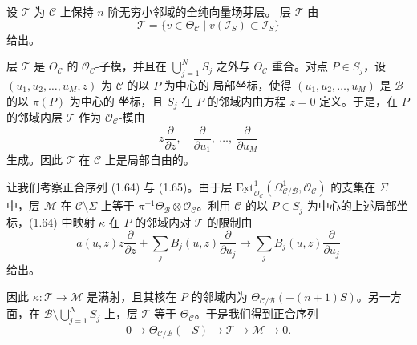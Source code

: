 设 $\mathcal{T}$ 为 $\mathcal{C}$ 上保持 $n$ 阶无穷小邻域的全纯向量场芽层。
层 $\mathcal{T}$ 由
\begin{equation}
\mathcal{T}=\{v\in\Theta_{\mathcal{C}}\mid
v(\mathcal{I}_S)\subset\mathcal{I}_S\} \tag{1.66}
\end{equation}
给出。

层 $\mathcal{T}$ 是 $\Theta_{\mathcal{C}}$ 的
$\mathcal{O}_{\mathcal{C}}$-子模，并且在
$\bigcup_{j=1}^{N}S_j$ 之外与 $\Theta_{\mathcal{C}}$ 重合。对点
$P\in S_j$，设 $(u_1,u_2,\dots,u_M,z)$ 为 $\mathcal{C}$ 的以 $P$ 为中心的
局部坐标，使得 $(u_1,u_2,\dots,u_M)$ 是 $\mathcal{B}$ 的以 $\pi(P)$ 为中心的
坐标，且 $S_j$ 在 $P$ 的邻域内由方程 $z=0$ 定义。于是，在 $P$ 的邻域内层
$\mathcal{T}$ 作为 $\mathcal{O}_{\mathcal{C}}$-模由
\[
z\frac{\partial}{\partial z},\quad
\frac{\partial}{\partial u_1},\ \dots,\
\frac{\partial}{\partial u_M}
\]
生成。因此 $\mathcal{T}$ 在 $\mathcal{C}$ 上是局部自由的。

让我们考察正合序列 (1.64) 与 (1.65)。由于层
$\underline{\mathrm{Ext}}^1_{\mathcal{O}_{\mathcal{C}}}
(\Omega^1_{\mathcal{C}/\mathcal{B}},\mathcal{O}_{\mathcal{C}})$ 的支集在
$\Sigma$ 中，层 $\mathcal{M}$ 在 $\mathcal{C}\setminus\Sigma$ 上等于
$\pi^{-1}\Theta_{\mathcal{B}}\otimes\mathcal{O}_{\mathcal{C}}$。利用
$\mathcal{C}$ 的以 $P\in S_j$ 为中心的上述局部坐标，(1.64) 中映射 $\kappa$
在 $P$ 的邻域内对 $\mathcal{T}$ 的限制由
\[
a(u,z)z\frac{\partial}{\partial z}
+\sum_j B_j(u,z)\frac{\partial}{\partial u_j}
\longmapsto\sum_j B_j(u,z)\frac{\partial}{\partial u_j}
\]
给出。


因此 $\kappa:\mathcal{T}\to\mathcal{M}$ 是满射，且其核在 $P$ 的邻域内为
$\Theta_{\mathcal{C}/\mathcal{B}}(-(n+1)S)$。另一方面，在
$\mathcal{B}\setminus\bigcup_{j=1}^{N}S_j$ 上，层 $\mathcal{T}$ 等于
$\Theta_{\mathcal{C}}$。于是我们得到正合序列
\begin{equation}
0\to\Theta_{\mathcal{C}/\mathcal{B}}(-S)\to\mathcal{T}
\to\mathcal{M}\to 0. \tag{1.67}
\end{equation}

